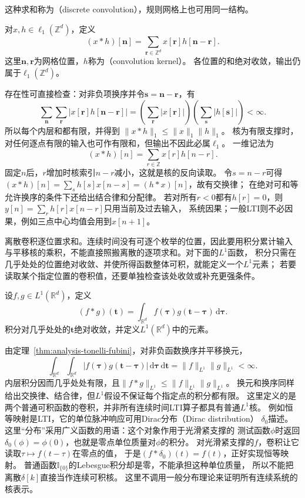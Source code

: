 这种求和称为（discrete convolution），规则网格上也可用同一结构。
\begin{definition}[网格上的离散卷积]
  \label{def:signal-analysis-discrete-convolution}
  对$x,h\in\ell_1(\mathbb Z^d)$，定义
  \begin{equation}
    (x*h)[\bm n]=\sum_{\bm r\in\mathbb Z^d}x[\bm r]h[\bm n-\bm r].
    \label{eq:signal-analysis-discrete-multidimensional-convolution}
  \end{equation}
  这里$\bm n,\bm r$为网格位置，$h$称为（convolution kernel）。
  各位置的和绝对收敛，输出仍属于$\ell_1(\mathbb Z^d)$。
\end{definition}
存在性可直接检查：对非负项换序并令$\bm s=\bm n-\bm r$，有
\[
  \sum_{\bm n}\sum_{\bm r}|x[\bm r]h[\bm n-\bm r]|
  =\left(\sum_{\bm r}|x[\bm r]|\right)
   \left(\sum_{\bm s}|h[\bm s]|\right)<\infty.
\]
所以每个内层和都有限，并得到
$\|x*h\|_1\leq\|x\|_1\|h\|_1$。
核为有限支撑时，对任何逐点有限的输入也可作有限和，但输出不因此必属$\ell_1$。
一维记法为
\begin{equation}
  (x*h)[n]=\sum_{r\in\mathbb Z}x[r]h[n-r].
  \label{eq:signal-analysis-linear-convolution}
\end{equation}
固定$n$后，$r$增加时核索引$n-r$减小，这就是核的反向读取。
令$s=n-r$可得$(x*h)[n]=\sum_s h[s]x[n-s]=(h*x)[n]$，故有交换律；
在绝对可和等允许换序的条件下还给出结合律和分配律。
若对所有$r<0$都有$h[r]=0$，则$y[n]=\sum_r h[r]x[n-r]$只用当前及过去输入，
系统因果；一般LTI则不必因果，例如三点中心均值会用到$x[n+1]$。

离散卷积逐位置求和。连续时间没有可逐个枚举的位置，因此要用积分累计输入
与平移核的乘积，不能直接照搬离散的逐项求和。对下面的$L^1$函数，
积分只需在几乎处处的位置绝对收敛、并使所得函数整体可积，就能定义一个$L^1$元素；
若要读取某个指定位置的卷积值，还要单独检查该处收敛或补充更强条件。
\begin{definition}[连续卷积]
  \label{def:signal-analysis-continuous-convolution}
  设$f,g\in L^1(\mathbb R^d)$，定义
  \begin{equation}
    (f*g)(\bm t)=\int_{\mathbb R^d}f(\bm\tau)g(\bm t-\bm\tau)\,\mathrm d\bm\tau.
    \label{eq:signal-analysis-continuous-convolution}
  \end{equation}
  积分对几乎处处的$\bm t$绝对收敛，并定义$L^1(\mathbb R^d)$中的元素。
\end{definition}
由定理~\ref{thm:analysis-tonelli-fubini}，对非负函数换序并平移换元，
\[
  \int_{\mathbb R^d}\int_{\mathbb R^d}
  |f(\bm\tau)g(\bm t-\bm\tau)|\,\mathrm d\bm\tau\,\mathrm d\bm t
  =\|f\|_{L^1}\|g\|_{L^1}<\infty.
\]
内层积分因而几乎处处有限，且$\|f*g\|_{L^1}\leq\|f\|_{L^1}\|g\|_{L^1}$。
换元和换序同样给出交换律、结合律，但$L^1$假设不保证每个指定点的积分都有限。
这里定义的是两个普通可积函数的卷积，并非所有连续时间LTI算子都具有普通$L^1$核。
例如恒等映射是LTI，它的单位脉冲响应可用Dirac分布（Dirac distribution）
$\delta_0$描述。这里“分布”采用广义函数的用语：这个对象作用于光滑紧支撑的
测试函数$\phi$时返回$\delta_0(\phi)=\phi(0)$，也就是零点单位质量对$\phi$的积分。
对光滑紧支撑的$f$，卷积让它读取$\tau\mapsto f(t-\tau)$在零点的值，
于是$(f*\delta_0)(t)=f(t)$，正好实现恒等映射。
普通函数$\mathbb I_{\{0\}}$的Lebesgue积分却是零，不能承担这种单位质量，
所以不能把离散$\delta[k]$直接当作连续可积核。
这里不调用一般分布理论来证明所有连续系统的核表示。

